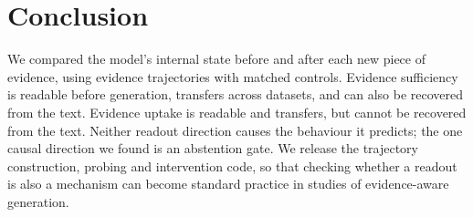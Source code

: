\section{Conclusion}
We compared the model's internal state before and after each new piece of evidence, using evidence trajectories with matched controls. Evidence sufficiency is readable before generation, transfers across datasets, and can also be recovered from the text. Evidence uptake is readable and transfers, but cannot be recovered from the text. Neither readout direction causes the behaviour it predicts; the one causal direction we found is an abstention gate. We release the trajectory construction, probing and intervention code, so that checking whether a readout is also a mechanism can become standard practice in studies of evidence-aware generation.
